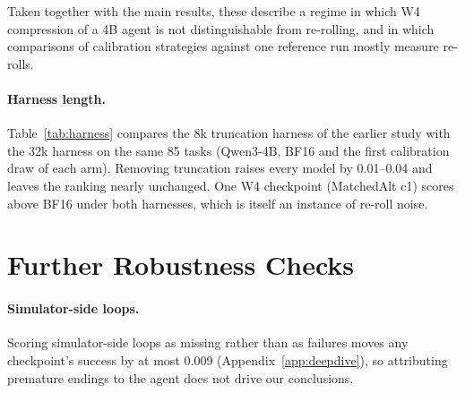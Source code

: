 Taken together with the main results, these describe a regime in which W4 compression of a 4B agent is not distinguishable from re-rolling, and in which comparisons of calibration strategies against one reference run mostly measure re-rolls.

\paragraph{Harness length.} Table~\ref{tab:harness} compares the 8k truncation harness of the earlier study with the 32k harness on the same 85 tasks (Qwen3-4B, BF16 and the first calibration draw of each arm). Removing truncation raises every model by 0.01--0.04 and leaves the ranking nearly unchanged. One W4 checkpoint (MatchedAlt c1) scores above BF16 under both harnesses, which is itself an instance of re-roll noise.

\begin{table}[h]
\centering
\footnotesize
\setlength{\tabcolsep}{4pt}
\caption{Pooled database match under 8k and 32k harnesses, with the 8k truncation rate per domain (4B study). Traj-All and Traj-Novel are two trajectory-based calibration arms, renamed for anonymity.}
\label{tab:harness}
\end{table}

\section{Further Robustness Checks}
\label{app:robust}

\paragraph{Simulator-side loops.} Scoring simulator-side loops as missing rather than as failures moves any checkpoint's success by at most 0.009 (Appendix~\ref{app:deepdive}), so attributing premature endings to the agent does not drive our conclusions.

